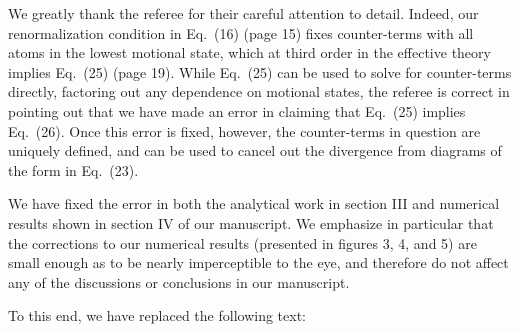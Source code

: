 \documentclass[preprint,showkeys,nofootinbib]{revtex4-1}
\newcommand{\1}{\mathds{1}}
\begin{document}
\begin{enumerate}
  We greatly thank the referee for their careful attention to detail.
  Indeed, our renormalization condition in Eq.~(16) (page 15) fixes
  counter-terms with all atoms in the lowest motional state, which at
  third order in the effective theory implies Eq.~(25) (page 19).
  While Eq.~(25) can be used to solve for counter-terms directly,
  factoring out any dependence on motional states, the referee is
  correct in pointing out that we have made an error in claiming that
  Eq.~(25) implies Eq.~(26).  Once this error is fixed, however, the
  counter-terms in question are uniquely defined, and can be used to
  cancel out the divergence from diagrams of the form in Eq.~(23).

  We have fixed the error in both the analytical work in section III
  and numerical results shown in section IV of our manuscript.  We
  emphasize in particular that the corrections to our numerical
  results (presented in figures 3, 4, and 5) are small enough as to be
  nearly imperceptible to the eye, and therefore do not affect any of
  the discussions or conclusions in our manuscript.

  To this end, we have replaced the following text:


\end{enumerate}
\end{document}
